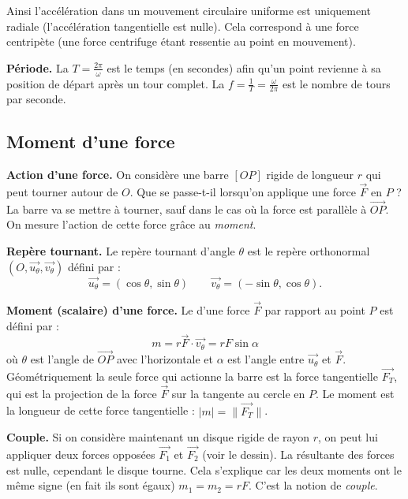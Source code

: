 \documentclass[11pt,class=report,crop=false]{standalone}
\begin{document}
Ainsi l'accélération dans un mouvement circulaire uniforme est uniquement radiale (l'accélération tangentielle est nulle). Cela correspond à une force centripète (une force centrifuge étant ressentie au point en mouvement).

\textbf{Période.}
La  $T = \frac{2\pi}{\omega}$ est le temps (en secondes) afin qu'un point revienne à sa position de départ après un tour complet. 
La  $f = \frac{1}{T} = \frac{\omega}{2\pi}$ est le nombre de tours par seconde.


\subsection{Moment d'une force}

\textbf{Action d'une force.}
On considère une barre $[OP]$ rigide de longueur $r$ qui peut tourner autour de $O$.
Que se passe-t-il lorsqu'on applique une force $\vec{F}$ en $P$ ?
La barre va se mettre à tourner, sauf dans le cas où la force est parallèle à $\vec{OP}$. On mesure l'action de cette force grâce au \emph{moment}.

\textbf{Repère tournant.}
Le repère tournant d'angle $\theta$ est le repère orthonormal 
$(O, \vec{u_\theta}, \vec{v_\theta})$ défini par :
$$\vec{u_\theta} = (\cos\theta,\sin\theta)
\qquad
\vec{v_\theta} = (-\sin\theta,\cos\theta).$$


\textbf{Moment (scalaire) d'une force.}
Le  d'une force $\vec{F}$ par rapport au point $P$ est défini par :
$$m = r \vec{F} \cdot \vec{v_\theta} = r F \sin \alpha$$
où $\theta$ est l'angle de $\vec{OP}$ avec l'horizontale 
et $\alpha$ est l'angle entre $\vec{u_\theta}$ et $\vec{F}$.
Géométriquement la seule force qui actionne la barre est la force tangentielle $\vec{F_T}$, qui est la projection de la force $\vec{F}$ sur la tangente au cercle en $P$. Le moment est la longueur de cette force tangentielle : $|m| = \| \vec{F_T} \|$. 



\textbf{Couple.} 
Si on considère maintenant un disque rigide de rayon $r$, on peut lui appliquer deux forces opposées $\vec{F_1}$ et $\vec{F_2}$ (voir le dessin).
La résultante des forces est nulle, cependant le disque tourne.
Cela s'explique car les deux moments ont le même signe (en fait ils sont égaux)
$m_1 = m_2 =  r F$. C'est la notion de \emph{couple}.
\end{document}
